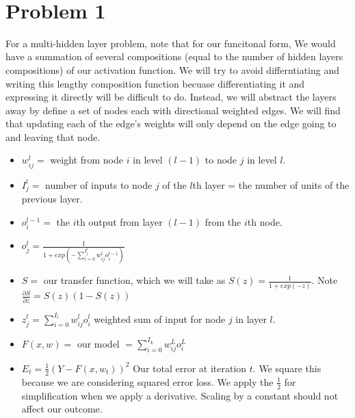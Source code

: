 \documentclass[11pt]{article}
\begin{document}
\begin{center}

\ \\
\end{center}

\section*{Problem 1}

\vspace{5 mm}
\noindent
For a multi-hidden layer problem, note that for our funcitonal form, We would 
have a summation of several compositions (equal to the number of hidden layers 
compositions) of our activation function. We will try to avoid differntiating 
and writing this lengthy composition function becuase differentiating it and 
expressing it directly will be difficult to do. Instead, we will abstract the 
layers away by define a set of nodes each with directional weighted edges. We 
will find that updating each of the edge's weights will only depend on the 
edge going to and leaving that node. 

\begin{itemize}
\item $w_{ij}^{l} = $ weight from node $i$ in level $(l - 1)$ to node $j$ in 
level $l$.
\item $I_{j}^{l} = $ number of inputs to node $j$ of the $l$th layer = 
the number of units of the previous layer.
\item $o_{i}^{l - 1} = $ the $i$th output from layer $(l -1)$ from the $i$th 
node.
\item $o_{j}^{l} = \frac{1}{1 + exp(-\sum_{i = 0}^{I_{j}^{l}} 
w_{ij}^{l} o_{i}^{l - 1})}$
\item $S = $ our transfer function, which we will take as $S(z) = 
\frac{1}{1 + exp(-z)}$. Note $\frac{\partial S}{\partial z} = S(z)(1 - S(z))$
\item $z_{j}^{l} = \sum_{i = 0}^{I_{l}} w_{ij}^{l} o_{i}^{l}$ weighted sum of 
input for node $j$ in layer $l$.
\item $F(x, w) = $ our model $ = \sum_{i = 0}^{I_{L}} w_{ij}^{L} o_{i}^{L}$
\item $E_{t} = \frac{1}{2}(Y - F(x, w_{t}))^{2} $ Our total error at iteration 
$t$. We square this because we are considering squared error loss. We apply the 
$\frac{1}{2}$ for simplification when we apply a derivative. Scaling by a 
constant should not affect our outcome.
\end{itemize}
\end{document}
